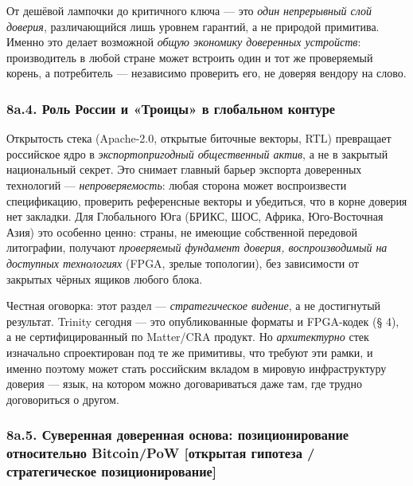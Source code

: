 \documentclass[
  russian,
]{article}
\begin{document}
От дешёвой лампочки до критичного ключа --- это \emph{один непрерывный
слой доверия}, различающийся лишь уровнем гарантий, а не природой
примитива. Именно это делает возможной \emph{общую экономику доверенных
устройств}: производитель в любой стране может встроить один и тот же
проверяемый корень, а потребитель --- независимо проверить его, не
доверяя вендору на слово.

\subsubsection{8a.4. Роль России и «Троицы» в глобальном
контуре}\label{a.4.-ux440ux43eux43bux44c-ux440ux43eux441ux441ux438ux438-ux438-ux442ux440ux43eux438ux446ux44b-ux432-ux433ux43bux43eux431ux430ux43bux44cux43dux43eux43c-ux43aux43eux43dux442ux443ux440ux435}

Открытость стека (Apache-2.0, открытые биточные векторы, RTL) превращает
российское ядро в \emph{экспортопригодный общественный актив}, а не в
закрытый национальный секрет. Это снимает главный барьер экспорта
доверенных технологий --- \emph{непроверяемость}: любая сторона может
воспроизвести спецификацию, проверить референсные векторы и убедиться,
что в корне доверия нет закладки. Для Глобального Юга (БРИКС, ШОС,
Африка, Юго-Восточная Азия) это особенно ценно: страны, не имеющие
собственной передовой литографии, получают \emph{проверяемый фундамент
доверия, воспроизводимый на доступных технологиях} (FPGA, зрелые
топологии), без зависимости от закрытых чёрных ящиков любого блока.

Честная оговорка: этот раздел --- \emph{стратегическое видение}, а не
достигнутый результат. Trinity сегодня --- это опубликованные форматы и
FPGA-кодек (§ 4), а не сертифицированный по Matter/CRA продукт. Но
\emph{архитектурно} стек изначально спроектирован под те же примитивы,
что требуют эти рамки, и именно поэтому может стать российским вкладом в
мировую инфраструктуру доверия --- язык, на котором можно договариваться
даже там, где трудно договориться о другом.

\subsubsection{8a.5. Суверенная доверенная основа: позиционирование
относительно Bitcoin/PoW {[}открытая гипотеза / стратегическое
позиционирование{]}}\label{a.5.-ux441ux443ux432ux435ux440ux435ux43dux43dux430ux44f-ux434ux43eux432ux435ux440ux435ux43dux43dux430ux44f-ux43eux441ux43dux43eux432ux430-ux43fux43eux437ux438ux446ux438ux43eux43dux438ux440ux43eux432ux430ux43dux438ux435-ux43eux442ux43dux43eux441ux438ux442ux435ux43bux44cux43dux43e-bitcoinpow-ux43eux442ux43aux440ux44bux442ux430ux44f-ux433ux438ux43fux43eux442ux435ux437ux430-ux441ux442ux440ux430ux442ux435ux433ux438ux447ux435ux441ux43aux43eux435-ux43fux43eux437ux438ux446ux438ux43eux43dux438ux440ux43eux432ux430ux43dux438ux435}
\end{document}

